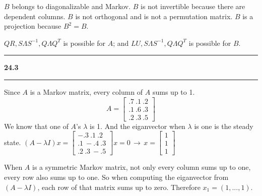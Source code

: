 \documentclass[11pt]{article}
\newcommand\question[2]{\vspace{.25in}\hrule\textbf{#1 #2}\vspace{.5em}\hrule\vspace{.10in}}
\begin{document}
\(B\) belongs to diagonalizable and Markov. \(B\) is not invertible because there are dependent columns. \(B\) is not orthogonal and is not a permutation matrix. \(B\) is a projection because \(B^2 = B\).

\(QR,S\Lambda S^{-1}, Q\Lambda Q^T\) is possible for \(A\); and \(LU, S\Lambda S^{-1}, Q\Lambda Q^T\) is possible for \(B\).

\question{24.3}{}
Since \(A\) is a Markov matrix, every column of \(A\) sums up to 1.
$$A = \begin{bmatrix} .7 \ .1 \ .2 \\ .1 \ .6 \ .3 \\ .2 \ .3 \ .5 \end{bmatrix}$$
We know that one of \(A\)'s \(\lambda\) is 1. And the eiganvector when \(\lambda\) is one is the steady state. \((A-\lambda I)x = \begin{bmatrix} -.3 \ .1 \ .2 \\ .1 \ -.4 \ .3 \\ .2 \ .3 \ -.5 \end{bmatrix}x = 0 \,\to\, x = \begin{bmatrix} 1 \\ 1 \\ 1 \end{bmatrix}\)

When \(A\) is a symmetric Markov matrix, not only every column sums up to one, every row also sums up to one. So when computing the eiganvector from \((A-\lambda I)\), each row of that matrix sums up to zero. Therefore \(x_1 = (1, ... , 1)\).
\end{document}
